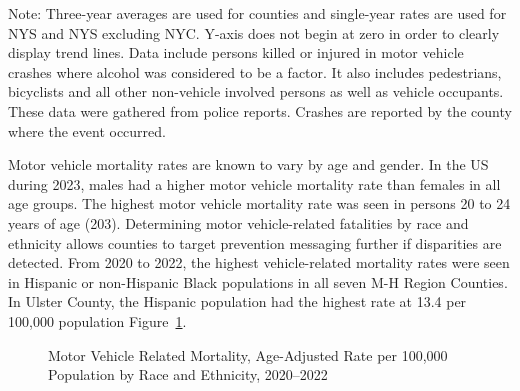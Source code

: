 \documentclass[
  english,
  letterpaper,
]{report}
\begin{document}
\begin{tcolorbox}[enhanced jigsaw, breakable, leftrule=.75mm, title=\textcolor{quarto-callout-note-color}{\faInfo}\hspace{0.5em}{Note}, bottomrule=.15mm, opacityback=0, left=2mm, colback=white, bottomtitle=1mm, coltitle=black, colbacktitle=quarto-callout-note-color!10!white, colframe=quarto-callout-note-color-frame, opacitybacktitle=0.6, toptitle=1mm, titlerule=0mm, arc=.35mm, rightrule=.15mm, toprule=.15mm]

Note: Three-year averages are used for counties and single-year rates
are used for NYS and NYS excluding NYC. Y-axis does not begin at zero in
order to clearly display trend lines. Data include persons killed or
injured in motor vehicle crashes where alcohol was considered to be a
factor. It also includes pedestrians, bicyclists and all other
non-vehicle involved persons as well as vehicle occupants. These data
were gathered from police reports. Crashes are reported by the county
where the event occurred.

\end{tcolorbox}

Motor vehicle mortality rates are known to vary by age and gender. In
the US during 2023, males had a higher motor vehicle mortality rate than
females in all age groups. The highest motor vehicle mortality rate was
seen in persons 20 to 24 years of age (203). Determining motor
vehicle-related fatalities by race and ethnicity allows counties to
target prevention messaging further if disparities are detected. From
2020 to 2022, the highest vehicle-related mortality rates were seen in
Hispanic or non-Hispanic Black populations in all seven M-H Region
Counties. In Ulster County, the Hispanic population had the highest rate
at 13.4 per 100,000 population Figure~\ref{fig-mva-mortal-rande-aar}.

\begin{figure}


\caption{\label{fig-mva-mortal-rande-aar}Motor Vehicle Related
Mortality, Age-Adjusted Rate per 100,000 Population by Race and
Ethnicity, 2020--2022}

\end{figure}%
\end{document}
